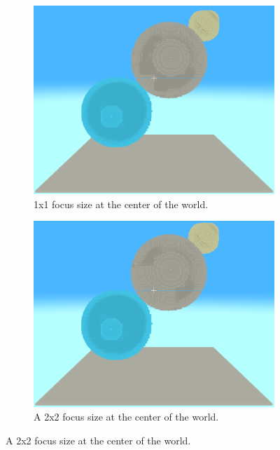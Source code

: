 \begin{figure}[htbp]
    \centering
    \begin{subfigure}[t]{0.32\textwidth}
        \centering
        \includegraphics[width=\textwidth]{figures/hybrid_focus_1.png}
        \caption{1x1 focus size at the center of the world.}
    \end{subfigure}
    \hfill
    \begin{subfigure}[t]{0.32\textwidth}
        \centering
        \includegraphics[width=\textwidth]{figures/hybrid_focus_2.png}
        \caption{A 2x2 focus size at the center of the world.}
    \end{subfigure}
    \hfill

\end{figure}
